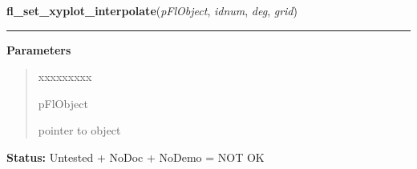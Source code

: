     \label{xformslib:flxyplot:fl_set_xyplot_interpolate}

    \vspace{0.5ex}

\hspace{.8\funcindent}\begin{boxedminipage}{\funcwidth}

    \raggedright \textbf{fl\_set\_xyplot\_interpolate}(\textit{pFlObject}, \textit{idnum}, \textit{deg}, \textit{grid})

    \vspace{-1.5ex}

    \rule{\textwidth}{0.5\fboxrule}
\setlength{\parskip}{2ex}
\setlength{\parskip}{1ex}
      \textbf{Parameters}
      \vspace{-1ex}

      \begin{quote}
        \begin{Ventry}{xxxxxxxxx}

          \item[pFlObject]

          pointer to object

        \end{Ventry}

      \end{quote}

\textbf{Status:} Untested + NoDoc + NoDemo = NOT OK



    \end{boxedminipage}

    \label{xformslib:flxyplot:fl_set_xyplot_inspect}

    \vspace{0.5ex}

